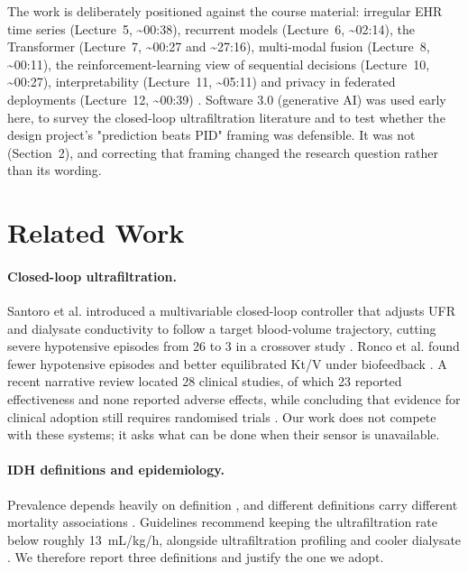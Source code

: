\documentclass{article}
\begin{document}
The work is deliberately positioned against the course material: irregular EHR time series (Lecture~5, \textasciitilde 00:38), recurrent models (Lecture~6, \textasciitilde 02:14), the Transformer (Lecture~7, \textasciitilde 00:27 and \textasciitilde 27:16), multi-modal fusion (Lecture~8, \textasciitilde 00:11), the reinforcement-learning view of sequential decisions (Lecture~10, \textasciitilde 00:27), interpretability (Lecture~11, \textasciitilde 05:11) and privacy in federated deployments (Lecture~12, \textasciitilde 00:39) \citep{md6329lectures}. Software 3.0 (generative AI) was used early here, to survey the closed-loop ultrafiltration literature and to test whether the design project's "prediction beats PID" framing was defensible. It was not (Section~2), and correcting that framing changed the research question rather than its wording.

\section{Related Work}

\paragraph{Closed-loop ultrafiltration.} Santoro et al. introduced a multivariable closed-loop controller that adjusts UFR and dialysate conductivity to follow a target blood-volume trajectory, cutting severe hypotensive episodes from 26 to 3 in a crossover study \citep{santoro1998biofeedback}. Ronco et al. found fewer hypotensive episodes and better equilibrated Kt/V under biofeedback \citep{ronco2000biofeedback}. A recent narrative review located 28 clinical studies, of which 23 reported effectiveness and none reported adverse effects, while concluding that evidence for clinical adoption still requires randomised trials \citep{dong2024closedloop}. Our work does not compete with these systems; it asks what can be done when their sensor is unavailable.

\paragraph{IDH definitions and epidemiology.} Prevalence depends heavily on definition \citep{kuipers2019prevalence}, and different definitions carry different mortality associations \citep{flythe2015idh}. Guidelines recommend keeping the ultrafiltration rate below roughly 13~mL/kg/h, alongside ultrafiltration profiling and cooler dialysate \citep{kdoqi2005cvd,china2022consensus}. We therefore report three definitions and justify the one we adopt.
\end{document}
